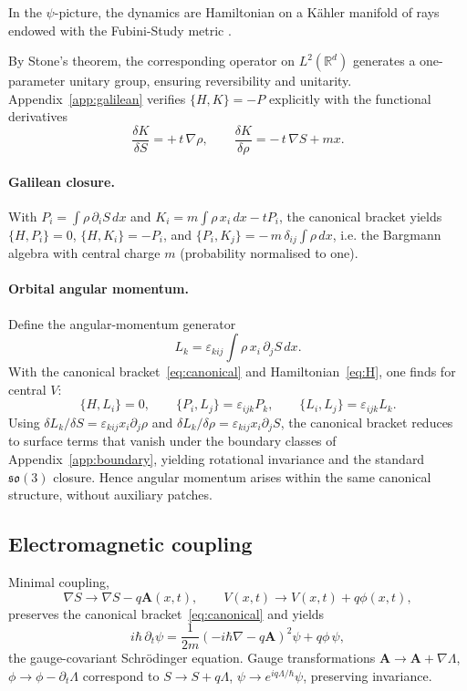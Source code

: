 \documentclass[11pt,a4paper]{article}
\numberwithin{equation}{section}
\theoremstyle{thmcompact}
\theoremstyle{remark}
\begin{document}
In the $\psi$-picture, the dynamics are Hamiltonian on a Kähler manifold of rays endowed with the Fubini-Study metric \cite{kibble1979,anandan1990}.

By Stone's theorem, the corresponding operator on $L^2(\mathbb{R}^d)$ generates a one-parameter unitary group, ensuring reversibility and unitarity.
Appendix~\ref{app:galilean} verifies $\{H,K\}=-P$ explicitly with the functional derivatives
\[
\frac{\delta K}{\delta S}=+\,t\,\nabla\rho,\qquad
\frac{\delta K}{\delta\rho}=-\,t\,\nabla S+mx.
\]

\paragraph{Galilean closure.}
With $P_i=\int \rho\,\partial_i S\,dx$ and $K_i=m\int \rho\,x_i\,dx - tP_i$, the canonical bracket yields $\{H,P_i\}=0$, $\{H,K_i\}=-P_i$, and $\{P_i,K_j\}=-\,m\,\delta_{ij}\!\int\!\rho\,dx$, i.e. the Bargmann algebra with central charge $m$ (probability normalised to one).

\paragraph{Orbital angular momentum.}
Define the angular-momentum generator
\[
L_k = \varepsilon_{kij}\!\int \rho\, x_i\,\partial_j S\,dx.
\]
With the canonical bracket~\eqref{eq:canonical} and Hamiltonian~\eqref{eq:H}, one finds for central $V$:
\[
\{H,L_i\}=0,\qquad \{P_i,L_j\}=\varepsilon_{ijk}P_k,\qquad \{L_i,L_j\}=\varepsilon_{ijk}L_k.
\]
Using $\delta L_k/\delta S=\varepsilon_{kij}x_i\partial_j\rho$ and $\delta L_k/\delta\rho=\varepsilon_{kij}x_i\partial_j S$, the canonical bracket reduces to surface terms that vanish under the boundary classes of Appendix~\ref{app:boundary}, yielding rotational invariance and the standard $\mathfrak{so}(3)$ closure. Hence angular momentum arises within the same canonical structure, without auxiliary patches.
	
\subsection{Electromagnetic coupling}

Minimal coupling,
\[
\nabla S\rightarrow\nabla S-q\mathbf{A}(x,t),\qquad
V(x,t)\rightarrow V(x,t)+q\phi(x,t),
\]
preserves the canonical bracket~\eqref{eq:canonical} and yields
\[
i\hbar\,\partial_t\psi
=\frac{1}{2m}\left(-i\hbar\nabla-q\mathbf{A}\right)^2\psi+q\phi\,\psi,
\]
the gauge-covariant Schrödinger equation.
Gauge transformations $\mathbf{A}\!\to\!\mathbf{A}+\nabla\Lambda$, $\phi\!\to\!\phi-\partial_t\Lambda$ correspond to $S\!\to\!S+q\Lambda$, $\psi\!\to\!e^{iq\Lambda/\hbar}\psi$, preserving invariance.
\end{document}
